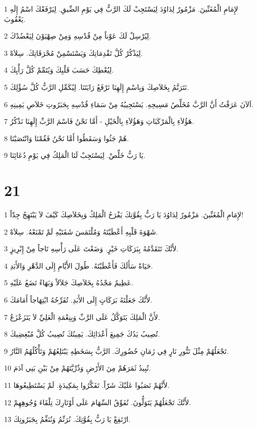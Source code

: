 \par 1 لإِمَامِ الْمُغَنِّينَ. مَزْمُورٌ لِدَاوُدَ لِيَسْتَجِبْ لَكَ الرَّبُّ فِي يَوْمِ الضِّيقِ. لِيَرْفَعْكَ اسْمُ إِلَهِ يَعْقُوبَ.
\par 2 لِيُرْسِلْ لَكَ عَوْناً مِنْ قُدْسِهِ وَمِنْ صِهْيَوْنَ لِيَعْضُدْكَ.
\par 3 لِيَذْكُرْ كُلَّ تَقْدِمَاتِكَ وَيَسْتَسْمِنْ مُحْرَقَاتِكَ. سِلاَهْ.
\par 4 لِيُعْطِكَ حَسَبَ قَلْبِكَ وَيُتَمِّمْ كُلَّ رَأْيِكَ.
\par 5 نَتَرَنَّمُ بِخَلاَصِكَ وَبِاسْمِ إِلَهِنَا نَرْفَعُ رَايَتَنَا. لِيُكَمِّلِ الرَّبُّ كُلَّ سُؤْلِكَ.
\par 6 اَلآنَ عَرَفْتُ أَنَّ الرَّبَّ مُخَلِّصُ مَسِيحِهِ. يَسْتَجِيبُهُ مِنْ سَمَاءِ قُدْسِهِ بِجَبَرُوتِ خَلاَصِ يَمِينِهِ.
\par 7 هَؤُلاَءِ بِالْمَرْكَبَاتِ وَهَؤُلاَءِ بِالْخَيْلِ - أَمَّا نَحْنُ فَاسْمَ الرَّبِّ إِلَهِنَا نَذْكُرُ.
\par 8 هُمْ جَثُوا وَسَقَطُوا أَمَّا نَحْنُ فَقُمْنَا وَانْتَصَبْنَا.
\par 9 يَا رَبُّ خَلِّصْ. لِيَسْتَجِبْ لَنَا الْمَلِكُ فِي يَوْمِ دُعَائِنَا.

\chapter{21}

\par 1 لإِمَامِ الْمُغَنِّينَ. مَزْمُورٌ لِدَاوُدَ يَا رَبُّ بِقُوَّتِكَ يَفْرَحُ الْمَلِكُ وَبِخَلاَصِكَ كَيْفَ لاَ يَبْتَهِجُ جِدّاً!
\par 2 شَهْوَةَ قَلْبِهِ أَعْطَيْتَهُ وَمُلْتَمَسَ شَفَتَيْهِ لَمْ تَمْنَعْهُ. سِلاَهْ.
\par 3 لأَنَّكَ تَتَقَدَّمُهُ بِبَرَكَاتِ خَيْرٍ. وَضَعْتَ عَلَى رَأْسِهِ تَاجاً مِنْ إِبْرِيزٍ.
\par 4 حَيَاةً سَأَلَكَ فَأَعْطَيْتَهُ. طُولَ الأَيَّامِ إِلَى الدَّهْرِ وَالأَبَدِ.
\par 5 عَظِيمٌ مَجْدُهُ بِخَلاَصِكَ جَلاَلاً وَبَهَاءً تَضَعُ عَلَيْهِ.
\par 6 لأَنَّكَ جَعَلْتَهُ بَرَكَاتٍ إِلَى الأَبَدِ. تُفَرِّحُهُ ابْتِهَاجاً أَمَامَكَ.
\par 7 لأَنَّ الْمَلِكَ يَتَوَكَّلُ عَلَى الرَّبِّ وَبِنِعْمَةِ الْعَلِيِّ لاَ يَتَزَعْزَعُ.
\par 8 تُصِيبُ يَدُكَ جَمِيعَ أَعْدَائِكَ. يَمِينُكَ تُصِيبُ كُلَّ مُبْغِضِيكَ.
\par 9 تَجْعَلُهُمْ مِثْلَ تَنُّورِ نَارٍ فِي زَمَانِ حُضُورِكَ. الرَّبُّ بِسَخَطِهِ يَبْتَلِعُهُمْ وَتَأْكُلُهُمُ النَّارُ.
\par 10 تُبِيدُ ثَمَرَهُمْ مِنَ الأَرْضِ وَذُرِّيَّتَهُمْ مِنْ بَيْنِ بَنِي آدَمَ.
\par 11 لأَنَّهُمْ نَصَبُوا عَلَيْكَ شَرّاً. تَفَكَّرُوا بِمَكِيدَةٍ. لَمْ يَسْتَطِيعُوهَا.
\par 12 لأَنَّكَ تَجْعَلُهُمْ يَتَوَلُّونَ. تُفَوِّقُ السِّهَامَ عَلَى أَوْتَارِكَ تِلْقَاءَ وُجُوهِهِمْ.
\par 13 ارْتَفِعْ يَا رَبُّ بِقُوَّتِكَ. نُرَنِّمُ وَنُنَغِّمُ بِجَبَرُوتِكَ.

